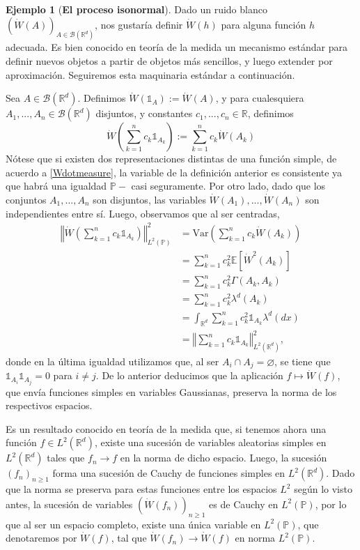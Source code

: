 \documentclass[letterpaper,twoside]{book}
\newcommand{\R}{\mathbb{R}}
\newcommand{\B}{\mathcal{B}}
\newcommand{\E}{\mathbb{E}}
\renewcommand{\P}{\mathbb{P}}
\newcommand{\W}{\dot{W}}
\newcommand{\1}{\mathds{1}}
\renewcommand{\to}{\rightarrow}
\newcommand{\norm}[1]{\left\Vert #1 \right\Vert}
\theoremstyle{definition}
\theoremstyle{definition}
\theoremstyle{definition}
\theoremstyle{definition}
\theoremstyle{definition}
\theoremstyle{definition}
\newtheorem{ejem}{Ejemplo}
\theoremstyle{definition}
\begin{document}
\begin{ejem}[\textbf{El proceso isonormal}] 
Dado un ruido blanco $\left(\W(A)\right)_{A\in \B(\R^d)}$, nos gustaría definir $\W(h)$ para alguna función $h$ adecuada. Es bien conocido en teoría de la medida un mecanismo estándar para definir nuevos objetos a partir de objetos más sencillos, y luego extender por aproximación. Seguiremos esta maquinaria estándar a continuación.

Sea $A\in \B(\R^d)$. Definimos $\W(\1_A):=\W(A)$, y para cualesquiera $A_1,...,A_n\in \B(\R^{d})$ disjuntos, y constantes $c_1,...,c_n\in \R$,  definimos
\[
\W \left(\sum_{k=1}^{n}c_k\1_{A_k}\right):=\sum_{k=1}^{n}c_k\W(A_k)    
\]
Nótese que si existen dos representaciones distintas de una función simple, de acuerdo a \eqref{Wdotmeasure}, la variable de la definición anterior es consistente ya que habrá una igualdad $\P-$ casi seguramente. Por otro lado, dado que los conjuntos $A_1,...,A_n$ son disjuntos, las variables $\W(A_1),...,\W(A_n)$ son independientes entre sí. Luego, observamos que al ser centradas,
\begin{align*}
    \norm{\W \left(\sum_{k=1}^{n}c_k\1_{A_k}\right)}_{L^{2}(\P)}^2&=\text{Var}\left(\sum_{k=1}^{n}c_k\W(A_k)\right)\\
    &=\sum_{k=1}^{n}c_k^2 \E\left[\W^2(A_k)\right]\\
    &=\sum_{k=1}^{n}c_k^2 \Gamma(A_k,A_k)\\
    &=\sum_{k=1}^{n}c_k^2\lambda^{d}(A_k)\\
    &=\int_{\R^d}\sum_{k=1}^{n}c_k^2\1_{A_k}\lambda^d(dx)\\
    &=\norm{\sum_{k=1}^{n}c_k\1_{A_k}}^2_{L^{2}(\R^{d})},
\end{align*}
donde en la última igualdad utilizamos que, al ser $A_i\cap A_j=\varnothing$, se tiene que $\1_{A_i}\1_{A_j}=0$ para $i\neq j$. De lo anterior deducimos que la aplicación $f\longmapsto \W(f)$, que envía funciones simples en variables Gaussianas, preserva la norma de los respectivos espacios.

Es un resultado conocido en teoría de la medida que, si tenemos ahora una función $f\in L^{2}(\R^{d})$, existe una sucesión de variables aleatorias simples en $L^{2}(\R^d)$ tales que $f_n\to f$ en la norma de dicho espacio. Luego, la sucesión $(f_n)_{n\ge 1}$ forma una sucesión de Cauchy de funciones simples en $L^2(\R^{d})$. Dado que la norma se preserva para estas funciones entre los espacios $L^2$ según lo visto antes, la sucesión de variables $(\W(f_n))_{n\ge 1}$ es de Cauchy en $L^{2}(\P)$, por lo que al ser un espacio completo, existe una única variable en $L^{2}(\P)$, que denotaremos por $\W(f)$, tal que $\W(f_n)\longrightarrow \W(f)$ en norma $L^{2}(\P)$.


\end{ejem}
\end{document}
